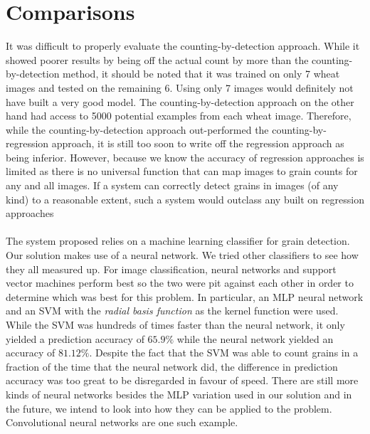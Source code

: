 \section{Comparisons}
It was difficult to properly evaluate the counting-by-detection approach. While it showed poorer results by being off the actual count by more than the counting-by-detection method, it should be noted that it was trained on only 7 wheat images and tested on the remaining 6. Using only 7 images would definitely not have built a very good model. The counting-by-detection approach on the other hand had access to 5000 potential examples from each wheat image. Therefore, while the counting-by-detection approach out-performed the counting-by-regression approach, it is still too soon to write off the regression approach as being inferior. However, because we know the accuracy of regression approaches is limited as there is no universal function that can map images to grain counts for any and all images. If a system can correctly detect grains in images (of any kind) to a reasonable extent, such a system would outclass any built on regression approaches\\ \\
%
The system proposed relies on a machine learning classifier for grain detection. Our solution makes use of a neural network. We tried other classifiers to see how they all measured up. For image classification, neural networks and support vector machines perform best so the two were pit against each other in order to determine which was best for this problem. In particular, an MLP neural network and an SVM with the \textit{radial basis function} as the kernel function were used. While the SVM was hundreds of times faster than the neural network, it only yielded a prediction accuracy of $65.9\%$ while the neural network yielded an accuracy of $81.12\%$. Despite the fact that the SVM was able to count grains in a fraction of the time that the neural network did, the difference in prediction accuracy was too great to be disregarded in favour of speed. There are still more kinds of neural networks besides the MLP variation used in our solution and in the future, we intend to look into how they can be applied to the problem. Convolutional neural networks are one such example. 



\bigskip




